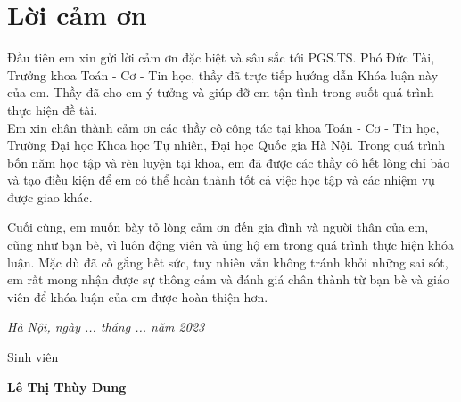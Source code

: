 \chapter*{Lời cảm ơn}

\fontsize{14}{16}\selectfont
\begin{center}
\end{center}

Đầu tiên em xin gửi lời cảm ơn đặc biệt và sâu sắc tới PGS.TS. Phó Đức Tài, Trưởng
khoa Toán - Cơ - Tin học, thầy đã trực tiếp hướng dẫn Khóa luận này của em.
Thầy đã cho em ý tưởng và giúp đỡ em tận tình trong suốt quá trình thực hiện đề tài. \\

Em xin chân thành cảm ơn các thầy cô công tác tại khoa Toán - Cơ - Tin học,
Trường Đại học Khoa học Tự nhiên, Đại học Quốc gia Hà Nội. Trong quá trình bốn
năm học tập và rèn luyện tại khoa, em đã được các thầy cô hết lòng chỉ bảo và tạo
điều kiện để em có thể hoàn thành tốt cả việc học tập và các nhiệm vụ được giao
khác.

Cuối cùng, em muốn bày tỏ lòng cảm ơn đến gia đình và người thân của em, cũng như 
bạn bè, vì luôn động viên và ủng hộ em trong quá trình thực hiện khóa luận. 
Mặc dù đã cố gắng hết sức, tuy nhiên vẫn không tránh khỏi những sai sót, em rất mong 
nhận được sự thông cảm và đánh giá chân thành từ bạn bè và giáo viên để khóa luận của 
em được hoàn thiện hơn.
\begin{flushright}
{\it Hà Nội, ngày ... tháng ... năm 2023}

Sinh viên\hskip 2cm\quad

\vskip 1cm
{\bf Lê Thị Thùy Dung} \hskip 1cm \quad\ 
 \end{flushright}



